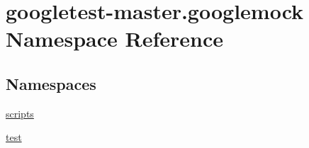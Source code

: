 \hypertarget{namespacegoogletest-master_1_1googlemock}{}\section{googletest-\/master.googlemock Namespace Reference}
\label{namespacegoogletest-master_1_1googlemock}
\subsection*{Namespaces}
\begin{DoxyCompactItemize}
\item 
 \mbox{\hyperlink{namespacegoogletest-master_1_1googlemock_1_1scripts}{scripts}}
\item 
 \mbox{\hyperlink{namespacegoogletest-master_1_1googlemock_1_1test}{test}}
\end{DoxyCompactItemize}
